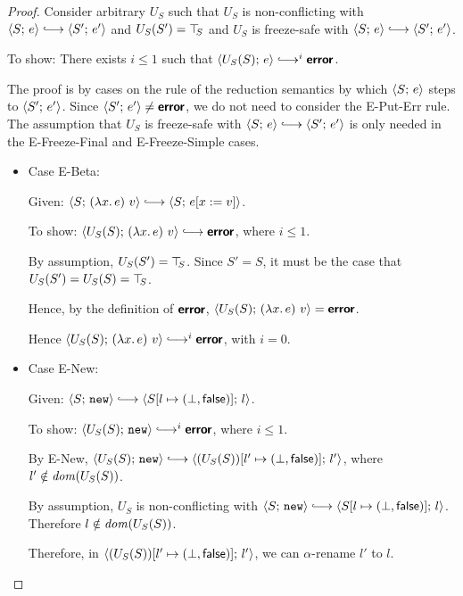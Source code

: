 \begin{proof}
  Consider arbitrary $U_S$ such that $U_S$ is non-conflicting with
  $\config{S}{e} \parstepsto \config{S'}{e'}$ and $U_S(S') = \top\hspace{-0.85mm}_{S}$
  and $U_S$ is freeze-safe with $\config{S}{e} \parstepsto
  \config{S'}{e'}$.

  To show: There exists $i \leq 1$ such that $\config{U_S(S)}{e}
  \parstepsto^i \error$.

  The proof is by cases on the rule of the reduction semantics by
  which $\langle S;\, e \rangle$ steps to $\langle S';\, e' \rangle$.  Since
  $\langle S';\, e' \rangle \neq \textbf{\textsf{error}}$, we do not need to consider the {\sc
    E-Put-Err} rule.  The assumption that $U_S$ is freeze-safe with
  $\config{S}{e} \parstepsto \config{S'}{e'}$ is only needed in the
  {\sc E-Freeze-Final} and {\sc E-Freeze-Simple} cases.

  \begin{itemize}

  \item Case {\sc E-Beta}:

    Given: $\config{S}{\app{(\lam{x}{e})}{v}} \parstepsto
    \config{S}{\subst{e}{x}{v}}$.

    To show: $\config{U_S(S)}{\app{(\lam{x}{e})}{v}} \parstepsto
    \error$, where $i \leq 1$.

    By assumption, $U_S(S') = \top\hspace{-0.85mm}_{S}$.  Since $S' = S$, it must be the
    case that $U_S(S') = U_S(S) = \top\hspace{-0.85mm}_{S}$.

    Hence, by the definition of $\textbf{\textsf{error}}$,
    $\langle U_S(S);\, (\lambda x.\,e)~v \rangle = \textbf{\textsf{error}}$.

    Hence $\config{U_S(S)}{\app{(\lam{x}{e})}{v}} \parstepsto^i
    \error$, with $i = 0$.

  \item Case {\sc E-New}:

    Given: $\config{S}{\NEW} \parstepsto
    \config{\extS{S}{l}{\bot}{\frozenfalse}}{l}$.

    To show: $\config{U_S(S)}{\NEW} \parstepsto^i \error$, where $i
    \leq 1$.

    By {\sc E-New}, $\config{U_S(S)}{\NEW} \parstepsto
    \config{\extS{(U_S(S))}{l'}{\bot}{\frozenfalse}}{l'}$, where $l'
    \notin \mathit{dom}(U_S(S))$.

    By assumption, $U_S$ is non-conflicting with $\config{S}{\NEW}
    \parstepsto \config{\extS{S}{l}{\bot}{\frozenfalse}}{l}$.
    Therefore $l \notin \mathit{dom}(U_S(S))$.

    Therefore, in
    $\langle (U_S(S))[l' \mapsto (\bot, \textsf{false})];\, l' \rangle$, we
    can $\alpha$-rename $l'$ to $l$.


\end{itemize}
\end{proof}
